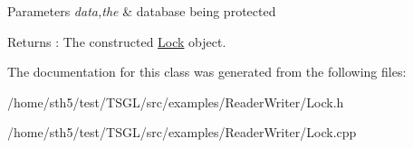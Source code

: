 \begin{DoxyParams}{Parameters}
{\em data,the} & database being protected \\
\hline
\end{DoxyParams}
\begin{DoxyReturn}{Returns}
\+: The constructed \hyperlink{class_lock}{Lock} object. 
\end{DoxyReturn}


The documentation for this class was generated from the following files\+:\begin{DoxyCompactItemize}
\item 
/home/sth5/test/\+T\+S\+G\+L/src/examples/\+Reader\+Writer/Lock.\+h\item 
/home/sth5/test/\+T\+S\+G\+L/src/examples/\+Reader\+Writer/Lock.\+cpp\end{DoxyCompactItemize}
